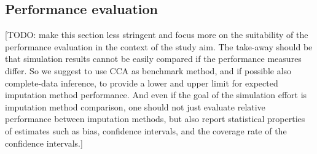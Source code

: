 \documentclass[bimj,fleqn]{w-art}
\begin{document}








\subsection{Performance evaluation}


[TODO: make this section less stringent and focus more on the suitability of the performance evaluation in the context of the study aim. The take-away should be that simulation results cannot be easily compared if the performance measures differ. So we suggest to use CCA as benchmark method, and if possible also complete-data inference, to provide a lower and upper limit for expected imputation method performance. And even if the goal of the simulation effort is imputation method comparison, one should not just evaluate relative performance between imputation methods, but also report statistical properties of estimates such as bias, confidence intervals, and the coverage rate of the confidence intervals.]
\end{document}
